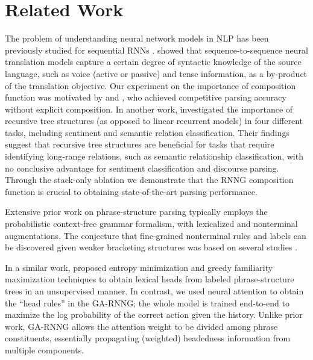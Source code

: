 \documentclass[11pt]{article}
\newcommand{\lpk}[1]{\textcolor{green}{{\textbf{[#1 --\textsc{lpk}]}}}}
\newcommand{\nascomment}[1]{\textcolor{blue}{{\textbf{[#1 --\textsc{nas}]}}}}
\renewcommand{\lpk}[1]{}
\renewcommand{\nascomment}[1]{}
\begin{document}
\section{Related Work}\label{sec:related_works}
The problem of understanding neural network models in NLP has been previously studied for sequential RNNs \cite{karpathy_15,li_16}.  showed that sequence-to-sequence neural translation models capture a certain degree of syntactic knowledge of the source language, such as voice (active or passive) and tense information, as a by-product of the translation objective. Our experiment on the importance of composition function was motivated by  and , who achieved competitive parsing accuracy without explicit composition. In another work,  investigated the importance of recursive tree structures (as opposed to linear recurrent models) in four different tasks, including sentiment and semantic relation classification. Their findings suggest that recursive tree structures are beneficial for tasks that require identifying long-range relations, such as semantic relationship classification, with no conclusive advantage for sentiment classification and discourse parsing. Through the stack-only ablation we demonstrate that the RNNG composition function is crucial to obtaining state-of-the-art parsing performance.

Extensive prior work on phrase-structure parsing typically employs the probabilistic context-free grammar formalism, with lexicalized \cite{collins_97} and nonterminal \cite{johnson_98,klein_03} augmentations. The conjecture that fine-grained nonterminal rules and labels can be discovered given weaker bracketing structures was based on several studies \cite{chiang_02,klein_02,petrov_2006}. 

In a similar work,  proposed entropy minimization and greedy familiarity maximization techniques to obtain lexical heads from labeled phrase-structure trees in an unsupervised manner. In contrast, we used neural attention to obtain the ``head rules'' in the GA-RNNG; the whole model is trained end-to-end to maximize the log probability of the correct action given the history. Unlike prior work, GA-RNNG allows the attention weight to be divided among phrase constituents, essentially propagating (weighted) headedness information from multiple components. 

\nascomment{be sure to discuss chiang and bikel; petrov and other latent variable PCFG papers}
\lpk{one thing make slav's paper interesting is that he find basically that some of the nonterminal categories need to be more fine-grained than others' (table 1 in http://www.petrovi.de/data/acl06.pdf). It would be interesting if we see something like this in our finding.}
\end{document}
